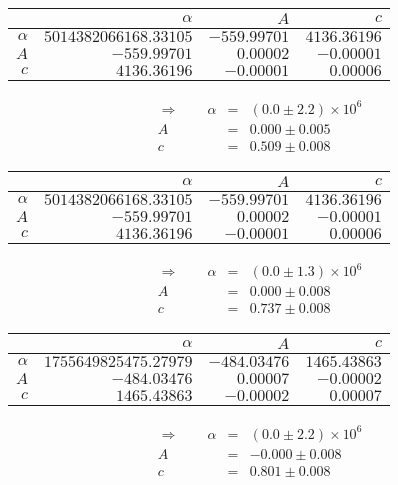  \begin{tabular}{|r|r|r|r|}
 \hline 
\cellcolor{tabcolor}&\cellcolor{tabcolor}$\alpha$&\cellcolor{tabcolor}$A$&\cellcolor{tabcolor}$c$\\ \hline 
 \cellcolor{tabcolor}$\alpha$&$5014382066168.33105$ &$-559.99701$ &$4136.36196$ \\ \hline
\cellcolor{tabcolor}$A$&$-559.99701$ &$0.00002$ &$-0.00001$ \\ \hline
\cellcolor{tabcolor}$c$&$4136.36196$ &$-0.00001$ &$0.00006$ \\ \hline
\end{tabular}
\begin{align}\Rightarrow \qquad
    \alpha &=& \left(0.0 \pm 2.2\right) \times 10^{6} \\
    A &=& 0.000 \pm 0.005 \\
    c &=& 0.509 \pm 0.008 
\end{align}

 \begin{tabular}{|r|r|r|r|}
 \hline 
\cellcolor{tabcolor}&\cellcolor{tabcolor}$\alpha$&\cellcolor{tabcolor}$A$&\cellcolor{tabcolor}$c$\\ \hline 
 \cellcolor{tabcolor}$\alpha$&$5014382066168.33105$ &$-559.99701$ &$4136.36196$ \\ \hline
\cellcolor{tabcolor}$A$&$-559.99701$ &$0.00002$ &$-0.00001$ \\ \hline
\cellcolor{tabcolor}$c$&$4136.36196$ &$-0.00001$ &$0.00006$ \\ \hline
\end{tabular}
\begin{align}\Rightarrow \qquad
    \alpha &=& \left(0.0 \pm 1.3\right) \times 10^{6} \\
    A &=& 0.000 \pm 0.008 \\
    c &=& 0.737 \pm 0.008 
\end{align}

 \begin{tabular}{|r|r|r|r|}
 \hline 
\cellcolor{tabcolor}&\cellcolor{tabcolor}$\alpha$&\cellcolor{tabcolor}$A$&\cellcolor{tabcolor}$c$\\ \hline 
 \cellcolor{tabcolor}$\alpha$&$1755649825475.27979$ &$-484.03476$ &$1465.43863$ \\ \hline
\cellcolor{tabcolor}$A$&$-484.03476$ &$0.00007$ &$-0.00002$ \\ \hline
\cellcolor{tabcolor}$c$&$1465.43863$ &$-0.00002$ &$0.00007$ \\ \hline
\end{tabular}
\begin{align}\Rightarrow \qquad
    \alpha &=& \left(0.0 \pm 2.2\right) \times 10^{6} \\
    A &=& -0.000 \pm 0.008 \\
    c &=& 0.801 \pm 0.008 
\end{align}

